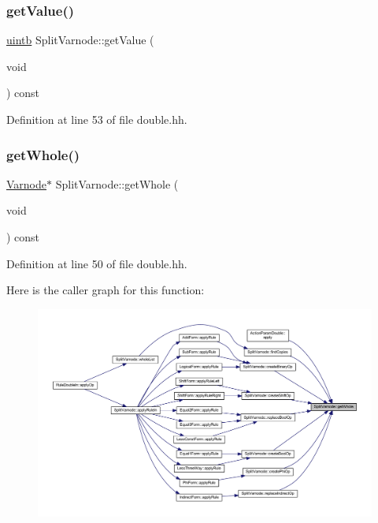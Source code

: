 \subsubsection{\texorpdfstring{getValue()}{getValue()}}
{\footnotesize\ttfamily \mbox{\hyperlink{types_8h_a2db313c5d32a12b01d26ac9b3bca178f}{uintb}} Split\+Varnode\+::get\+Value (\begin{DoxyParamCaption}\item[{void}]{ }\end{DoxyParamCaption}) const\hspace{0.3cm}{\ttfamily [inline]}}



Definition at line 53 of file double.\+hh.

\mbox{\label{class_split_varnode_af26a6359a12ff242114c755a29872246}} 
\subsubsection{\texorpdfstring{getWhole()}{getWhole()}}
{\footnotesize\ttfamily \mbox{\hyperlink{class_varnode}{Varnode}}$\ast$ Split\+Varnode\+::get\+Whole (\begin{DoxyParamCaption}\item[{void}]{ }\end{DoxyParamCaption}) const\hspace{0.3cm}{\ttfamily [inline]}}



Definition at line 50 of file double.\+hh.

Here is the caller graph for this function\+:
\nopagebreak
\begin{figure}[H]
\begin{center}
\leavevmode
\includegraphics[width=350pt]{class_split_varnode_af26a6359a12ff242114c755a29872246_icgraph}
\end{center}
\end{figure}
\mbox{\label{class_split_varnode_a6ac0b1ddf23347d284482e0bb02b00de}} 
